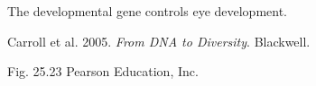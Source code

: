\documentclass[t,handout]{beamer}  %
\begin{document}
%
{
\begin{frame}[t]{The  developmental gene controls eye development.}

	\vfilll
	
	\tiny Carroll et al. 2005. \textit{From DNA to Diversity}. Blackwell.
\end{frame}
}
%
{
\begin{frame}[b]

	\tiny Fig. 25.23 \textcopyright Pearson Education, Inc.
\end{frame}
}
%
\end{document}
